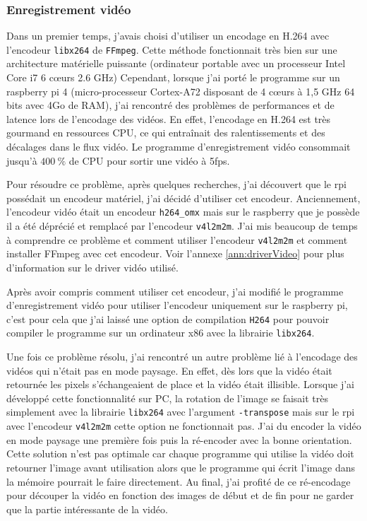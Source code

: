 \documentclass[a4paper, 11pt, french]{article}
\begin{document}

\subsubsection{Enregistrement vidéo}

Dans un premier temps, j'avais choisi d'utiliser un encodage en H.264 avec l'encodeur \texttt{libx264} de \texttt{FFmpeg}. Cette méthode fonctionnait très bien sur une architecture matérielle puissante (ordinateur portable avec un processeur Intel Core i7 6 c\oe urs  2.6 GHz) Cependant, lorsque j'ai porté le programme sur un raspberry pi 4 (micro-processeur Cortex-A72 disposant de 4 c\oe urs à 1,5 GHz 64 bits avec 4Go de RAM), j'ai rencontré des problèmes de performances et de latence lors de l'encodage des vidéos. En effet, l'encodage en H.264 est très gourmand en ressources CPU, ce qui entraînait des ralentissements et des décalages dans le flux vidéo. Le programme d'enregistrement vidéo consommait jusqu'à \(400\ \%\) de CPU pour sortir une vidéo à 5fps.

Pour résoudre ce problème, après quelques recherches, j'ai découvert que le rpi possédait un encodeur matériel, j'ai décidé d'utiliser cet encodeur. Anciennement, l'encodeur vidéo était un encodeur \texttt{h264\_omx} mais sur le raspberry que je possède il a été déprécié et remplacé  par l'encodeur \texttt{v4l2m2m}. J'ai mis beaucoup de temps à comprendre ce problème et comment utiliser l'encodeur \texttt{v4l2m2m} et comment installer FFmpeg avec cet encodeur. Voir l'annexe \ref{ann:driverVideo} pour plus d'information sur le driver vidéo utilisé.

Après avoir compris comment utiliser cet encodeur, j'ai modifié le programme d'enregistrement vidéo pour utiliser l'encodeur uniquement sur le raspberry pi, c'est pour cela que j'ai laissé une option de compilation \texttt{H264} pour pouvoir compiler le programme sur un ordinateur x86 avec la librairie \texttt{libx264}.


Une fois ce problème résolu, j'ai rencontré un autre problème lié à l'encodage des vidéos qui n'était pas en mode paysage. En effet, dès lors que la vidéo était retournée les pixels s'échangeaient de place et la vidéo était illisible. Lorsque j'ai développé cette fonctionnalité sur PC, la rotation de l'image se faisait très simplement avec la librairie \texttt{libx264} avec l'argument \texttt{-transpose} mais sur le rpi avec l'encodeur \texttt{v4l2m2m} cette option ne fonctionnait pas. J'ai du encoder la vidéo en mode paysage une première fois puis la ré-encoder avec la bonne orientation. Cette solution n'est pas optimale car chaque programme qui utilise la vidéo doit retourner l'image avant utilisation alors que le programme qui écrit l'image dans la mémoire pourrait le faire directement. Au final, j'ai profité de ce ré-encodage pour découper la vidéo en fonction des images de début et de fin pour ne garder que la partie intéressante de la vidéo.
\end{document}

